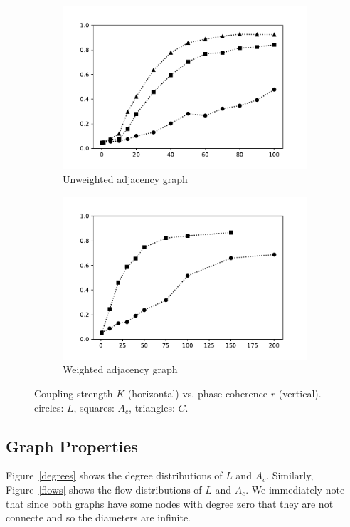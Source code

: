 \documentclass[10pt]{article}
\begin{document}
\begin{figure}[t]\centering
\begin{subfigure}{.48\textwidth}\centering
    \includegraphics[width=\textwidth]{img/couple_strength.pdf}
    \caption{Unweighted adjacency graph}
    \label{couplinguw}
\end{subfigure}\hfill
\begin{subfigure}{.48\textwidth}\centering
    \includegraphics[width=\textwidth]{img/couple_strength_g.pdf}
    \caption{Weighted adjacency graph}
    \label{couplingw}
\end{subfigure}
\caption{Coupling strength \( K \) (horizontal) vs. phase coherence \( r \) (vertical). circles: \( L \), squares: \( A_c \), triangles: \( C \).}
\label{coupling}
\end{figure}

\subsection{Graph Properties}
Figure~\ref{degrees} shows the degree distributions of \( L \) and \( A_c \). Similarly, Figure~\ref{flows} shows the flow distributions of \( L \) and \( A_c \). We immediately note that since both graphs have some nodes with degree zero that they are not connecte and so the diameters are infinite.
\end{document}
